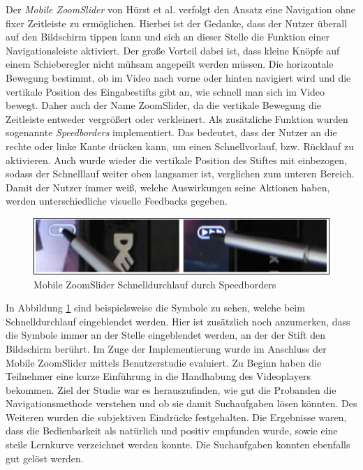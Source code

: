 \documentclass[11pt,a4paper]{report}
\begin{document}
Der \emph{Mobile ZoomSlider} von Hürst et al. \cite{hurst2007interactive} verfolgt den Ansatz eine Navigation ohne fixer Zeitleiste zu ermöglichen. Hierbei ist der Gedanke, dass der Nutzer überall auf den Bildschirm tippen kann und sich an dieser Stelle die Funktion einer Navigationsleiste aktiviert. Der große Vorteil dabei ist, dass kleine Knöpfe auf einem Schieberegler nicht mühsam angepeilt werden müssen. Die horizontale Bewegung bestimmt, ob im Video nach vorne oder hinten navigiert wird und die vertikale Position des Eingabestifts gibt an, wie schnell man sich im Video bewegt. Daher auch der Name ZoomSlider, da die vertikale Bewegung die Zeitleiste entweder vergrößert oder verkleinert. Als zusätzliche Funktion wurden sogenannte \emph{Speedborders} implementiert. Das bedeutet, dass der Nutzer an die rechte oder linke Kante drücken kann, um einen Schnellvorlauf, bzw. Rücklauf zu aktivieren. Auch wurde wieder die vertikale Position des Stiftes mit einbezogen, sodass der Schnelllauf weiter oben langsamer ist, verglichen zum unteren Bereich. Damit der Nutzer immer weiß, welche Auswirkungen seine Aktionen haben, werden unterschiedliche visuelle Feedbacks gegeben.
\begin{figure}[h]
\begin{center}
\includegraphics[scale=1]{./images/13.png}
\caption{Mobile ZoomSlider Schnelldurchlauf durch Speedborders \cite{hurst2007interactive}}
\label{mobile_zoomslider}
\end{center}
\end{figure}
In Abbildung \ref{mobile_zoomslider} sind beispielsweise die Symbole zu sehen, welche beim Schnelldurchlauf eingeblendet werden. Hier ist zusätzlich noch anzumerken, dass die Symbole immer an der Stelle eingeblendet werden, an der der Stift den Bildschirm berührt. Im Zuge der Implementierung wurde im Anschluss der Mobile ZoomSlider mittels Benutzerstudie evaluiert. Zu Beginn haben die Teilnehmer eine kurze Einführung in die Handhabung des Videoplayers bekommen. Ziel der Studie war es herauszufinden, wie gut die Probanden die Navigationsmethode verstehen und ob sie damit Suchaufgaben lösen könnten. Des Weiteren wurden die subjektiven Eindrücke festgehalten. Die Ergebnisse waren, dass die Bedienbarkeit als natürlich und positiv empfunden wurde, sowie eine steile Lernkurve verzeichnet werden konnte. Die Suchaufgaben konnten ebenfalls gut gelöst werden.
\end{document}
